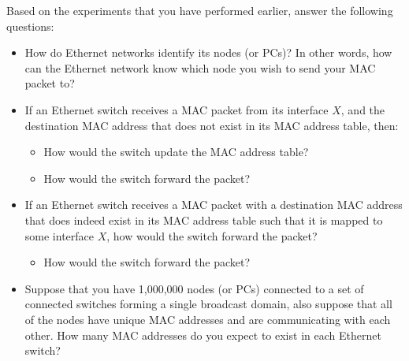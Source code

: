 \documentclass[pdftex,12pt,a4paper]{article}
\begin{document}
            Based on the experiments that you have performed earlier, answer
            the following questions:
            \begin{itemize}
                \item How do Ethernet networks identify its nodes (or PCs)? In
                other words, how can the Ethernet network know which node you
                wish to send your MAC packet to?
                \item If an Ethernet switch receives a MAC packet from its
                interface $X$, and the destination MAC address that does not
                exist in its MAC address table, then:
                    \begin{itemize}
                        \item How would the switch update the MAC address
                        table?
                        \item How would the switch forward the packet?
                    \end{itemize}
                \item If an Ethernet switch receives a MAC packet with a
                destination MAC address that does indeed exist in its MAC address
                table such that it is mapped to some interface $X$, how would
                the switch forward the packet?
                    \begin{itemize}
                        \item How would the switch forward the packet?
                    \end{itemize}
                \item Suppose that you have 1,000,000 nodes (or PCs) connected
                to a set of connected switches forming a single broadcast
                domain, also suppose that all of the nodes have unique MAC
                addresses and are communicating with each other. How many MAC
                addresses do you expect to exist in each Ethernet switch?
            \end{itemize}
\end{document}
